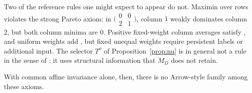 Two of the reference rules one might expect to appear do not. Maximin over rows violates the strong
Pareto axiom: in $\bigl(\begin{smallmatrix}0&0\\2&1\end{smallmatrix}\bigr)$, column $1$ weakly dominates
column $2$, but both column minima are $0$. Positive fixed-weight column averages satisfy , and
uniform weights add , but fixed unequal weights require persistent labels or additional input.
The selector $T^\nu$ of Proposition~\ref{prop:nu} is in general not a rule in the sense of
: it uses structural information that $M_D$ does not retain.

With common affine invariance alone, then, there is no Arrow-style family among these axioms.
